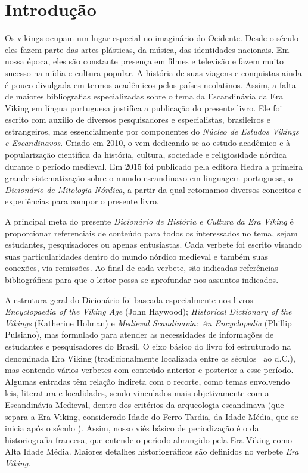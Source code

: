 \chapter[Introdução, \emph{por Johnni Langer}]{Introdução}\label{introd}

Os vikings ocupam um lugar especial no imaginário do Ocidente. Desde o
século  eles fazem parte das artes plásticas, da música, das
identidades nacionais. Em nossa época, eles são constante presença em
filmes e televisão e fazem muito sucesso na mídia e cultura popular. A
história de suas viagens e conquistas ainda é pouco divulgada em termos
acadêmicos pelos países neolatinos. Assim, a falta de maiores
bibliografias especializadas sobre o tema da Escandinávia da Era Viking
em língua portuguesa justifica a publicação do presente livro. Ele foi
escrito com auxílio de diversos pesquisadores e especialistas,
brasileiros e estrangeiros, mas essencialmente por componentes do
\emph{Núcleo de Estudos Vikings e Escandinavos}. Criado em 2010, o 
vem dedicando-se ao estudo acadêmico e à popularização científica da
história, cultura, sociedade e religiosidade nórdica durante o período
medieval. Em 2015 foi publicado pela editora Hedra a primeira grande
sistematização sobre o mundo escandinavo em linguagem portuguesa, o
\emph{Dicionário de Mitologia Nórdica}, a partir da qual retomamos
diversos conceitos e experiências para compor o presente livro.

A principal meta do presente \emph{Dicionário de História e Cultura da
Era Viking} é proporcionar referenciais de conteúdo para todos os
interessados no tema, sejam estudantes, pesquisadores ou apenas
entusiastas. Cada verbete foi escrito visando suas particularidades
dentro do mundo nórdico medieval e também suas conexões, via remissões.
Ao final de cada verbete, são indicadas referências bibliográficas para
que o leitor possa se aprofundar nos assuntos indicados.

A estrutura geral do Dicionário foi baseada especialmente nos livros
\emph{Encyclopaedia of the Viking Age} (John Haywood); \emph{Historical
Dictionary of the Vikings} (Katherine Holman) e \emph{Medieval
Scandinavia: An Encyclopedia} (Phillip Pulsiano), mas formulado para
atender as necessidades de informações de estudantes e pesquisadores do
Brasil. O eixo básico do livro foi estruturado na denominada Era Viking
(tradicionalmente localizada entre os séculos~ ao  d.C.), mas
contendo vários verbetes com conteúdo anterior e posterior a esse
período. Algumas entradas têm relação indireta com o recorte, como temas
envolvendo leis, literatura e localidades, sendo vinculados mais
objetivamente com a Escandinávia Medieval, dentro dos critérios da
arqueologia escandinava (que separa a Era Viking, considerado Idade
do Ferro Tardia, da Idade Média, que se inicia após o século ).
Assim, nosso viés básico de periodização é o da historiografia francesa,
que entende o período abrangido pela Era Viking como Alta Idade
Média. Maiores detalhes historiográficos são definidos no verbete
\emph{Era Viking}.

